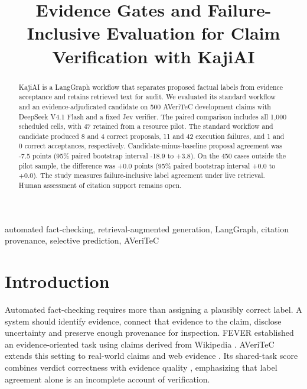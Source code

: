 \documentclass[conference]{IEEEtran}
\newcommand{\pct}{\%}
\begin{document}
\title{Evidence Gates and Failure-Inclusive Evaluation for Claim Verification with KajiAI}

\author{}
\maketitle

\begin{abstract}
KajiAI is a LangGraph workflow that separates proposed factual labels from evidence acceptance and retains retrieved text for audit. We evaluated its standard workflow and an evidence-adjudicated candidate on 500 AVeriTeC development claims with DeepSeek V4.1 Flash and a fixed Jev verifier. The paired comparison includes all 1,000 scheduled cells, with 47 retained from a resource pilot. The standard workflow and candidate produced 8 and 4 correct proposals, 11 and 42 execution failures, and 1 and 0 correct acceptances, respectively. Candidate-minus-baseline proposal agreement was -7.5 points (95\pct{} paired bootstrap interval -18.9 to +3.8). On the 450 cases outside the pilot sample, the difference was +0.0 points (95\pct{} paired bootstrap interval +0.0 to +0.0). The study measures failure-inclusive label agreement under live retrieval. Human assessment of citation support remains open.
\end{abstract}

\begin{IEEEkeywords}
automated fact-checking, retrieval-augmented generation, LangGraph, citation provenance, selective prediction, AVeriTeC
\end{IEEEkeywords}

\section{Introduction}
Automated fact-checking requires more than assigning a plausibly correct label. A system should identify evidence, connect that evidence to the claim, disclose uncertainty and preserve enough provenance for inspection. FEVER established an evidence-oriented task using claims derived from Wikipedia \cite{fever}. AVeriTeC extends this setting to real-world claims and web evidence \cite{averitec}. Its shared-task score combines verdict correctness with evidence quality \cite{sharedtask}, emphasizing that label agreement alone is an incomplete account of verification.
\end{document}
